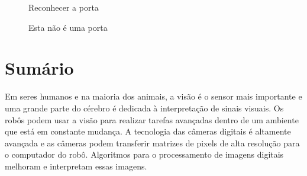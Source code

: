 \begin{figure}
\begin{minipage}{.45\textwidth}
\caption{Reconhecer a porta}\label{fig.door}
\end{minipage}
\hspace{\fill}
\begin{minipage}{.45\textwidth}
\caption{Esta não é uma porta}\label{fig.not-a-door}
\end{minipage}
\end{figure}


\section{Sumário}

Em seres humanos e na maioria dos animais, a visão é o sensor mais importante e uma grande parte do cérebro é dedicada à interpretação de sinais visuais. Os robôs podem usar a visão para realizar tarefas avançadas dentro de um ambiente que está em constante mudança. A tecnologia das câmeras digitais é altamente avançada e as câmeras podem transferir matrizes de pixels de alta resolução para o computador do robô. Algoritmos para o processamento de imagens digitais melhoram e interpretam essas imagens.

